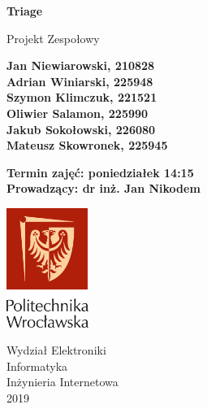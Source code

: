 \begin{titlepage}
   \begin{center}
        \vspace*{1cm}
        \Huge
        \textbf{Triage}
    
    \vspace{0.5cm}
    Projekt Zespołowy
    
    \vspace{1.5cm}
    
    \normalsize
    \textbf{
        Jan Niewiarowski,  210828\\
        Adrian Winiarski, 225948\\
        Szymon Klimczuk, 221521\\
        Oliwier Salamon, 225990\\
        Jakub Sokołowski, 226080\\
        Mateusz Skowronek, 225945
    }
    
    \normalsize
    \textbf{
    \newline
    \newline
        Termin zajęć: poniedziałek 14:15\\
        Prowadzący: dr inż. Jan Nikodem\\
    }
    \vfill
    
    
    \vspace{0.8cm}
    
    \includegraphics[width=0.2\textwidth]{img/pwr-logo.png}
    
    Wydział Elektroniki\\
    Informatyka\\
    Inżynieria Internetowa\\
    2019
 
   \end{center}
\end{titlepage}